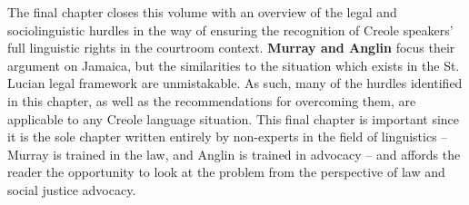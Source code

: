 The final chapter closes this volume with an overview of the legal and sociolinguistic hurdles in the way of ensuring the recognition of Creole speakers’ full linguistic rights in the courtroom context. \textbf{Murray and Anglin} focus their argument on Jamaica, but the similarities to the situation which exists in the St. Lucian legal framework are unmistakable. As such, many of the hurdles identified in this chapter, as well as the recommendations for overcoming them, are applicable to any Creole language situation. This final chapter is important since it is the sole chapter written entirely by non-experts in the field of linguistics -- Murray is trained in the law, and Anglin is trained in advocacy -- and affords the reader the opportunity to look at the problem from the perspective of law and social justice advocacy. 
